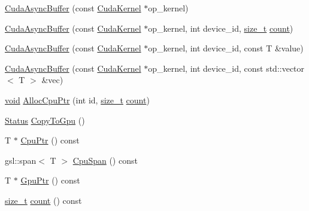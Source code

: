 \begin{DoxyCompactItemize}
\item 
\mbox{\hyperlink{classonnxruntime_1_1cuda_1_1CudaKernel_1_1CudaAsyncBuffer_a47503e3ac7f13180576bc5162c4a0144}{Cuda\+Async\+Buffer}} (const \mbox{\hyperlink{classonnxruntime_1_1cuda_1_1CudaKernel}{Cuda\+Kernel}} $\ast$op\+\_\+kernel)
\item 
\mbox{\hyperlink{classonnxruntime_1_1cuda_1_1CudaKernel_1_1CudaAsyncBuffer_ad7b7280f0e7bfe036eb42b3942c5ca68}{Cuda\+Async\+Buffer}} (const \mbox{\hyperlink{classonnxruntime_1_1cuda_1_1CudaKernel}{Cuda\+Kernel}} $\ast$op\+\_\+kernel, int device\+\_\+id, \mbox{\hyperlink{mlasi_8h_a503efbc1c6e50825320ad909366b78ab}{size\+\_\+t}} \mbox{\hyperlink{classonnxruntime_1_1cuda_1_1CudaKernel_1_1CudaAsyncBuffer_a52c7fbaddb4d9b8cf99d08031e201139}{count}})
\item 
\mbox{\hyperlink{classonnxruntime_1_1cuda_1_1CudaKernel_1_1CudaAsyncBuffer_aa7565b3bb125a043c51b11571c667133}{Cuda\+Async\+Buffer}} (const \mbox{\hyperlink{classonnxruntime_1_1cuda_1_1CudaKernel}{Cuda\+Kernel}} $\ast$op\+\_\+kernel, int device\+\_\+id, const T \&value)
\item 
\mbox{\hyperlink{classonnxruntime_1_1cuda_1_1CudaKernel_1_1CudaAsyncBuffer_a97550222aa391beebc4b990dc543b7d6}{Cuda\+Async\+Buffer}} (const \mbox{\hyperlink{classonnxruntime_1_1cuda_1_1CudaKernel}{Cuda\+Kernel}} $\ast$op\+\_\+kernel, int device\+\_\+id, const std\+::vector$<$ T $>$ \&vec)
\item 
\mbox{\hyperlink{mlasi_8h_a88f941d423cb2a819b70a1358982b1a6}{void}} \mbox{\hyperlink{classonnxruntime_1_1cuda_1_1CudaKernel_1_1CudaAsyncBuffer_a1987dd49b4f3fc47fe8c780ce232654d}{Alloc\+Cpu\+Ptr}} (int id, \mbox{\hyperlink{mlasi_8h_a503efbc1c6e50825320ad909366b78ab}{size\+\_\+t}} \mbox{\hyperlink{classonnxruntime_1_1cuda_1_1CudaKernel_1_1CudaAsyncBuffer_a52c7fbaddb4d9b8cf99d08031e201139}{count}})
\item 
\mbox{\hyperlink{classonnxruntime_1_1common_1_1Status}{Status}} \mbox{\hyperlink{classonnxruntime_1_1cuda_1_1CudaKernel_1_1CudaAsyncBuffer_ab0d0133fc7d6d9ca6cdd01b7ea7db54d}{Copy\+To\+Gpu}} ()
\item 
T $\ast$ \mbox{\hyperlink{classonnxruntime_1_1cuda_1_1CudaKernel_1_1CudaAsyncBuffer_a5d0e11c43d1ab7929d7b2f32bc24871c}{Cpu\+Ptr}} () const
\item 
gsl\+::span$<$ T $>$ \mbox{\hyperlink{classonnxruntime_1_1cuda_1_1CudaKernel_1_1CudaAsyncBuffer_a1719d3e411ca256e4b57898795ef58ca}{Cpu\+Span}} () const
\item 
T $\ast$ \mbox{\hyperlink{classonnxruntime_1_1cuda_1_1CudaKernel_1_1CudaAsyncBuffer_ae71102ba0407d6ec8f718625292cf66c}{Gpu\+Ptr}} () const
\item 
\mbox{\hyperlink{mlasi_8h_a503efbc1c6e50825320ad909366b78ab}{size\+\_\+t}} \mbox{\hyperlink{classonnxruntime_1_1cuda_1_1CudaKernel_1_1CudaAsyncBuffer_a52c7fbaddb4d9b8cf99d08031e201139}{count}} () const
\end{DoxyCompactItemize}
